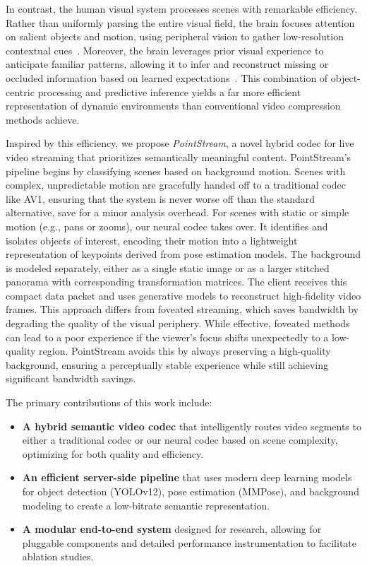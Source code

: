 \documentclass[manuscript, screen]{acmart}
\begin{document}
In contrast, the human visual system processes scenes with remarkable efficiency. Rather than uniformly parsing the entire visual field, the brain focuses attention on salient objects and motion, using peripheral vision to gather low-resolution contextual cues~\cite{cajar2016spatial}. Moreover, the brain leverages prior visual experience to anticipate familiar patterns, allowing it to infer and reconstruct missing or occluded information based on learned expectations~\cite{serences2006selective}. This combination of object-centric processing and predictive inference yields a far more efficient representation of dynamic environments than conventional video compression methods achieve.

Inspired by this efficiency, we propose {\em PointStream}, a novel hybrid codec for live video streaming that prioritizes semantically meaningful content. PointStream's pipeline begins by classifying scenes based on background motion. Scenes with complex, unpredictable motion are gracefully handed off to a traditional codec like AV1, ensuring that the system is never worse off than the standard alternative, save for a minor analysis overhead. For scenes with static or simple motion (e.g., pans or zooms), our neural codec takes over. It identifies and isolates objects of interest, encoding their motion into a lightweight representation of keypoints derived from pose estimation models. The background is modeled separately, either as a single static image or as a larger stitched panorama with corresponding transformation matrices. The client receives this compact data packet and uses generative models to reconstruct high-fidelity video frames. This approach differs from foveated streaming, which saves bandwidth by degrading the quality of the visual periphery. While effective, foveated methods can lead to a poor experience if the viewer's focus shifts unexpectedly to a low-quality region. PointStream avoids this by always preserving a high-quality background, ensuring a perceptually stable experience while still achieving significant bandwidth savings.

The primary contributions of this work include:
\begin{itemize}[topsep=0pt,itemsep=0pt,leftmargin=*]
\item \textbf{A hybrid semantic video codec} that intelligently routes video segments to either a traditional codec or our neural codec based on scene complexity, optimizing for both quality and efficiency.
\item \textbf{An efficient server-side pipeline} that uses modern deep learning models for object detection (YOLOv12), pose estimation (MMPose), and background modeling to create a low-bitrate semantic representation.
\item \textbf{A modular end-to-end system} designed for research, allowing for pluggable components and detailed performance instrumentation to facilitate ablation studies.
\end{itemize}
\end{document}
